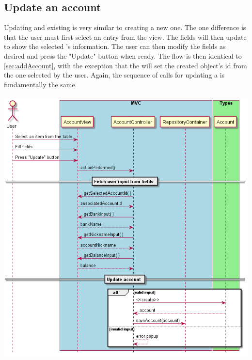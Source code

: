 \documentclass[12pt]{article}
\begin{document}
\subsection{Update an account}
Updating and existing  is very similar to creating a new one. The one difference is that the user must first select an entry from the view. The fields will then update to show the selected 's information. The user can then modify the fields as desired and press the "Update" button when ready. The flow is then identical to \ref{sec:addAccount}, with the exception that the  will set the created  object's id from the one selected by the user. Again, the sequence of calls for updating a  is fundamentally the same.\\
\\
\includegraphics[width=\textwidth,height=\textheight,keepaspectratio]{diagrams/sequence/updateAccount.png}
\bigskip
\end{document}
